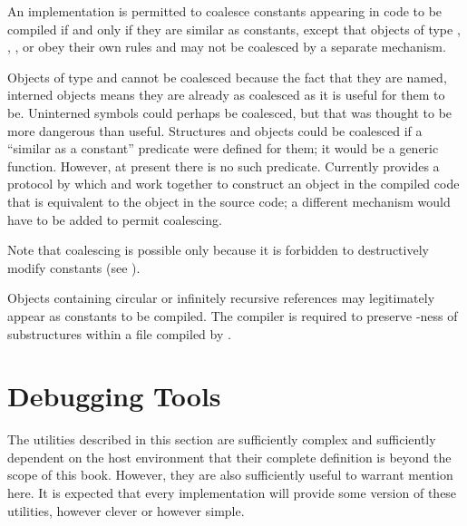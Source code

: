 An implementation is permitted to coalesce constants
appearing in code to be compiled if and only if they are similar as
constants, except that objects of type , ,
, or  obey their own rules
and may not be coalesced by a separate mechanism.

\beforenoterule
\begin{rationale}
Objects of type  and  cannot be coalesced because the fact
that they are named, interned objects means they are already as
coalesced as it is useful for them to be.  Uninterned symbols could
perhaps be coalesced, but that was thought to be more dangerous than
useful.  Structures and objects could be
coalesced if a ``similar as a constant'' predicate were defined for them;
it would be a generic function.  However, at present there is no such
predicate.  Currently  provides a protocol by which
 and  work together to construct an object in the
compiled code that is equivalent to the object in the source code;
a different mechanism would have to be added to permit coalescing.
\end{rationale}
\afternoterule

Note that coalescing is possible only because it is forbidden to
destructively modify constants  (see ).

Objects containing circular or infinitely recursive references may legitimately
appear as constants to be compiled.  The compiler is
required to preserve -ness of substructures within a file compiled
by .

\section{Debugging Tools}


The utilities described in this section are sufficiently complex
and sufficiently dependent on the host environment that their
complete definition is beyond the scope of this book.
However, they are also sufficiently
useful to warrant mention here.  It is expected that
every implementation will
provide some version of these utilities, however clever or however simple.

